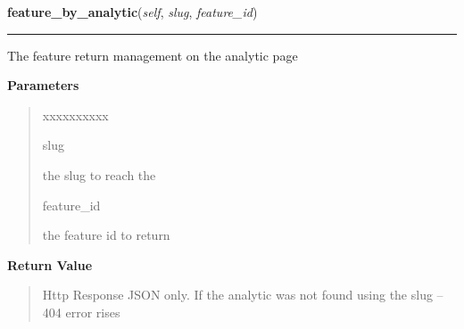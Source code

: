 \hspace{.8\funcindent}\begin{boxedminipage}{\funcwidth}

    \raggedright \textbf{feature\_by\_analytic}(\textit{self}, \textit{slug}, \textit{feature\_id})

    \vspace{-1.5ex}

    \rule{\textwidth}{0.5\fboxrule}
\setlength{\parskip}{2ex}
    The feature return management on the analytic page

\setlength{\parskip}{1ex}
      \textbf{Parameters}
      \vspace{-1ex}

      \begin{quote}
        \begin{Ventry}{xxxxxxxxxx}

          \item[slug]

          the slug to reach the

          \item[feature\_id]

          the feature id to return

        \end{Ventry}

      \end{quote}

      \textbf{Return Value}
    \vspace{-1ex}

      \begin{quote}
      Http Response JSON only. If the analytic was not found using the slug
      -- 404 error rises

      \end{quote}

    \end{boxedminipage}

    \label{morbid:views:search}

    \vspace{0.5ex}

